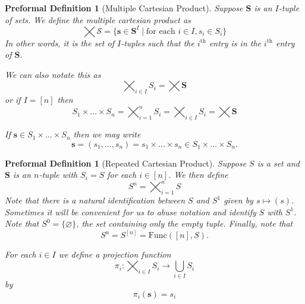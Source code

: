\documentclass[oneside, 12pt]{book}
\theoremstyle{break}
\newtheorem{preformal definition}[definition]{Preformal Definition}
\newtheorem{preformal theorem}[theorem]{Preformal Theorem}
\newcommand{\bv}[1]{\boldsymbol{#1}}
\begin{document}
			\begin{preformal definition}[Multiple Cartesian Product]
				Suppose $\bv{S}$ is an $I$-tuple of sets.
				We define the multiple cartesian product as
				\begin{equation*}
					\bigtimes \mathcal{S} = \{\bv{s} \in \bv{S}^I \mid \text{for each } i \in I, s_i \in S_i\}
				\end{equation*}				
				In other words, it is the set of $I$-tuples such that the $i^{\text{th}}$ entry is in the $i^{\text{th}}$ entry of $\bv{S}$.
				
				We can also notate this as
				\begin{equation*}
					\bigtimes_{i\in I} S_i = \bigtimes \bv{S}
				\end{equation*}
				or if $I=[n]$ then
				\begin{equation*}
					S_1 \times \ldots \times S_n = \bigtimes_{i=1}^n S_i = \bigtimes_{i\in I} S_i = \bigtimes \bv{S}
				\end{equation*}
				
				If $\bv{s} \in S_1 \times \ldots \times S_n$ then we may write
				\begin{equation*}
					\bv{s} = (s_1, \ldots, s_n) = s_1\times \ldots \times s_n \in S_1 \times \ldots \times S_n.
				\end{equation*}
			\end{preformal definition}
			
			\begin{preformal definition}[Repeated Cartesian Product]
				Suppose $S$ is a set and $\bv{S}$ is an $n$-tuple with $S_i = S$ for each $i\in [n]$.
				We then define
				\begin{equation*}
					S^n = \bigtimes_{i=1}^n S
				\end{equation*}
				Note that there is a natural identification between $S$ and $S^1$ given by $s \mapsto (s)$.
				Sometimes it will be convenient for us to abuse notation and identify $S$ with $S^1$.
				Note that $S^0 = \{\varnothing\}$, the set containing only the empty tuple.
				Finally, note that
				\begin{equation*}
					S^n = S^{[n]} = \text{Func}([n], S).
				\end{equation*}
				
				For each $i\in I$ we define a projection function
				\begin{equation*}
					\pi_i: \bigtimes_{i\in I} S_i \to \bigcup_{i\in I} S_i
				\end{equation*}
				by
				\begin{equation*}
					\pi_i(\bv{s}) = s_i
				\end{equation*}
				
			\end{preformal definition}
	
\end{document}
